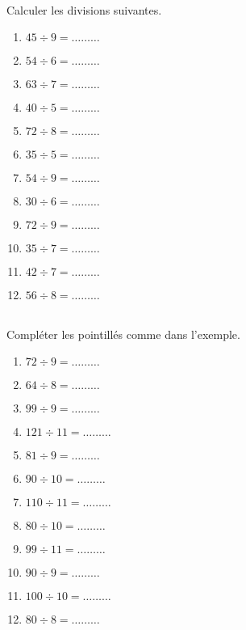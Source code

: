 \exercice \diff[2] \\
Calculer les divisions suivantes.
\begin{multicols}{4}
\begin{enumerate}
\item $45 \div 9 = \ldots\ldots\ldots $
\item $54 \div 6 = \ldots\ldots\ldots $
\item $63 \div 7 = \ldots\ldots\ldots $
\item $40 \div 5 = \ldots\ldots\ldots $
\item $72 \div 8 = \ldots\ldots\ldots $
\item $35 \div 5 = \ldots\ldots\ldots $
\item $54 \div 9 = \ldots\ldots\ldots $
\item $30 \div 6 = \ldots\ldots\ldots $
\item $72 \div 9 = \ldots\ldots\ldots $
\item $35 \div 7 = \ldots\ldots\ldots $
\item $42 \div 7 = \ldots\ldots\ldots $
\item $56 \div 8 = \ldots\ldots\ldots $
\end{enumerate}
\end{multicols}

\exercice \diff[3] \\
Compléter les pointillés comme dans l'exemple.
\begin{multicols}{4}
\begin{enumerate}
\item $72 \div 9 = \ldots\ldots\ldots $
\item $64 \div 8 = \ldots\ldots\ldots $
\item $99 \div 9 = \ldots\ldots\ldots $
\item $121 \div 11 = \ldots\ldots\ldots $
\item $81 \div 9 = \ldots\ldots\ldots $
\item $90 \div 10 = \ldots\ldots\ldots $
\item $110 \div 11 = \ldots\ldots\ldots $
\item $80 \div 10 = \ldots\ldots\ldots $
\item $99 \div 11 = \ldots\ldots\ldots $
\item $90 \div 9 = \ldots\ldots\ldots $
\item $100 \div 10 = \ldots\ldots\ldots $
\item $80 \div 8 = \ldots\ldots\ldots $
\end{enumerate}
\end{multicols}


